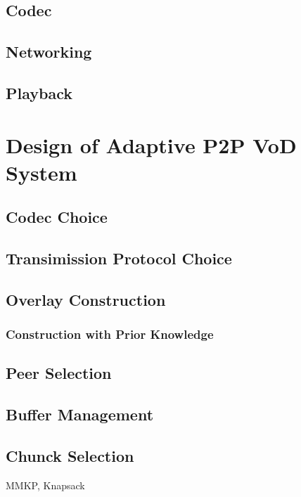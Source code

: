 \documentclass[11pt,a4paper]{article}
\begin{document}
\subsection{Codec}

\subsection{Networking}

\subsection{Playback}

\section{Design of Adaptive P2P VoD System}
\label{sec:p2p_vod}

\subsection{Codec Choice}

\subsection{Transimission Protocol Choice}


\subsection{Overlay Construction}


\subsubsection{Construction with Prior Knowledge}


\subsection{Peer Selection}


\subsection{Buffer Management}


\subsection{Chunck Selection}

MMKP, Knapsack
\end{document}
